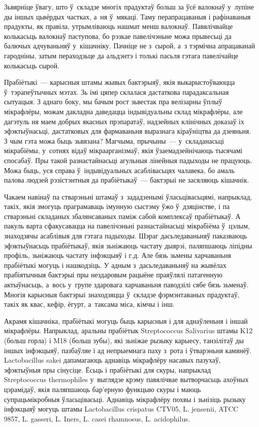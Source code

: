 Зьвярніце ўвагу, што ў~складзе многіх прадуктаў больш за ўсё валокнаў у~лупіне ды іншых цьвёрдых частках, а~ня ў~мякаці. Таму перапрацаваныя і рафінаваныя прадукты, як правіла, утрымліваюць нашмат менш валокнаў. Павялічвайце колькасьць валокнаў паступова, бо рэзкае павелічэньне можа прывесьці да балючых адчуваньняў у~кішачніку. Пачніце не з~сырой, а~з тэрмічна апрацаванай гародніны, затым пераходзьце да альдэнтэ і толькі пасьля гэтага павелічайце колькасьць сырой.

Прабіётыкі~--- карысныя штамы жывых бактэрыяў, якія выкарыстоўваюцца ў~тэрапеўтычных мэтах. Зь імі цяпер склалася дастаткова парадаксальная сытуацыя. З аднаго боку, мы бачым рост зьвестак пра велізарны ўплыў мікрафлёры, можам дакладна даведацца індывідуальны склад мікрафлёры, але дагэтуль ня маем добрых якасных прэпаратаў, надзейных клінічных доказаў іх эфэктыўнасьці, дастатковых для фармаваньня выразнага кіраўніцтва да дзеяньня. З чым гэта можа быць зьвязана? Магчыма, прычыны~--- у~складанасьці мікрабіёмы, у~сотнях відаў мікраарганізмаў, якія ўзаемадзейнічаюць тысячамі спосабаў. Пры такой разнастайнасьці агульныя лінейныя падыходы не працуюць. Можа быць, уся справа ў~індывідуальных асаблівасьцях чалавека, бо амаль палова людзей рэзістэнтныя да прабіётыкаў~--- бактэрыі не засяляюць кішачнік.

Чакаем навінаў па стварэньні штамаў з~зададзенымі ўласьцівасьцямі, напрыклад, такіх, якія змогуць праграмаваць імунную сыстэму ўжо ў~дзяцінстве, і па стварэньні складаных збалянсаваных паміж сабой комплексаў прабіётыкаў. А пакуль варта сфакусавацца на павелічэньні разнастайнасьці мікрабіёма ў~цэлым, знаходзячы асаблівыя для гэтага падыходы. Шэраг дасьледаваньняў паказваюць эфэктыўнасьць прабіётыкаў, якія зьніжаюць частату дыярэі, паляпшаюць ліпідны профіль, зьніжаюць частату інфэкцыяў і г.д. Але бязь зьмены харчаваньня прабіётыкі могуць і нашкодзіць. У адным з~дасьледаваньняў на жывёлах прабіятычныя бактэрыі пры нездаровым рацыёне праяўлялі патагенную актыўнасьць, а~вось у~групе здаровага харчаваньня паводзілі сябе бязь зьменаў. Многія карысныя бактэрыі знаходзяцца ў~складзе фэрмэнтаваных прадуктаў, такіх як квас, кефір, ёгурт, а~таксама міса, кімчы і інш.

Акрамя кішачніка, прабіётыкі могуць быць карысныя і для аднаўленьня і іншай мікрафлёры. Напрыклад, аральны прабіётык Streptococcus Salivarius штамы K12 (больш горла) і M18 (больш зубы), які зьніжае рызыку карыесу, танзілітаў ды іншых інфэкцыяў, пазбаўляе і ад непрыемнага паху з~рота і ўтварэньня камянёў. Lactobacillus sakei дапамагаюць аднавіць мікрафлёру насавых пазухаў, эфэктыўныя пры сінусіце. Ёсьць і прабіётыкі для скуры, напрыклад Streptococcus thermophiles у~выглядзе крэму павялічвае вытворчасьць ахоўных цэрамідаў, якія паляпшаюць бар'ерную функцыю скуры і маюць супрацьмікробныя ўласьцівасьці. Аднавіць мікрафлёру похвы і зьнізіць рызыку інфэкцыяў могуць штамы Lactobacillus crispatus CTV05, L. jensenii, ATCC 9857, L. gasseri, L. Iners, L. casei rhamnosus, L. acidophilus.

